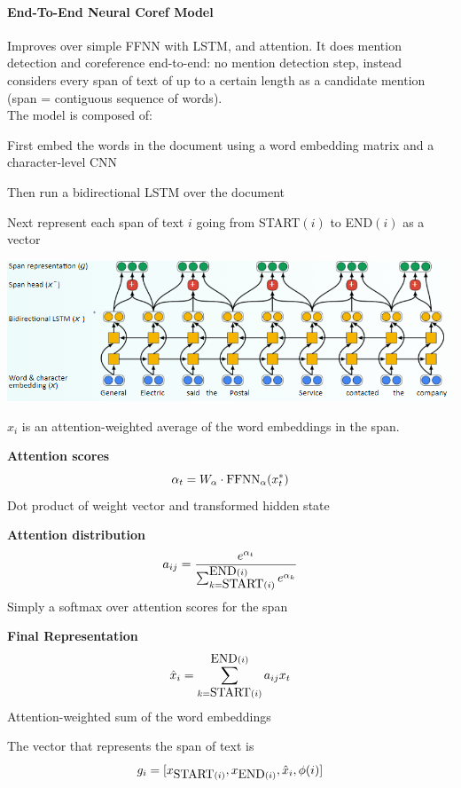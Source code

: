 \documentclass[10pt]{report}
\begin{document}
\paragraph{End-To-End Neural Coref Model}Improves over simple FFNN with LSTM, and attention. It does mention detection and coreference end-to-end: no mention detection step, instead considers every span of text of up to a certain length as a candidate mention (span = contiguous sequence of words).\\
The model is composed of:
\begin{list}{}{}
	\item First embed the words in the document using a word embedding matrix and a character-level CNN
	\item Then run a bidirectional LSTM over the document
	\item Next represent each span of text $i$ going from START$(i)$ to END$(i)$ as a vector
\end{list}
\begin{center}
	\includegraphics[scale=0.5]{113.png}
\end{center}
$\hat{x}_i$ is an attention-weighted average of the word embeddings in the span.
\begin{multicols}{3}
\begin{list}{}{}
	\item \textbf{Attention scores} $$\alpha_t = W_\alpha\cdot \hbox{FFNN}_\alpha(x^*_t)$$
	Dot product of weight vector and transformed hidden state
	\item \textbf{Attention distribution} $$a_{ij} = \frac{e^{\alpha_t}}{\sum_{k=\hbox{START}(i)}^{\hbox{END}(i)}e^{\alpha_k}}$$
	Simply a softmax over attention scores for the span
	\item \textbf{Final Representation} $$\hat{x}_i = \sum_{k=\hbox{START}(i)}^{\hbox{END}(i)} a_{ij}x_t$$
	Attention-weighted sum of the word embeddings
\end{list}
\end{multicols}
The vector that represents the span of text is
$$g_i = [x_{\hbox{START}(i)},x_{\hbox{END}(i)},\hat{x}_i, \phi(i)]$$
\end{document}
